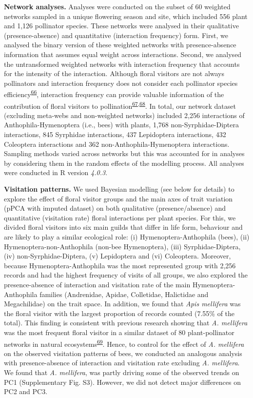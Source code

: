 \documentclass[12pt,a4paper,]{article}
\begin{document}
\textbf{Network analyses.} Analyses were conducted on the subset of 60
weighted networks sampled in a unique flowering season and site, which
included 556 plant and 1,126 pollinator species. These networks were
analysed in their qualitative (presence-absence) and quantitative
(interaction frequency) form. First, we analysed the binary version of
these weighted networks with presence-absence information that assumes
equal weight across interactions. Second, we analysed the untransformed
weighted networks with interaction frequency that accounts for the
intensity of the interaction. Although floral visitors are not always
pollinators and interaction frequency does not consider each pollinator
species
efficiency\textsuperscript{\protect\hyperlink{ref-ballantyne2015}{66}},
interaction frequency can provide valuable information of the
contribution of floral visitors to
pollination\textsuperscript{\protect\hyperlink{ref-vazquez2005}{67},\protect\hyperlink{ref-vazquez2012}{68}}.
In total, our network dataset (excluding meta-webs and non-weighted
networks) included 2,256 interactions of Anthophila-Hymenoptera (i.e.,
bees) with plants, 1,768 non-Syrphidae-Diptera interactions, 845
Syrphidae interactions, 437 Lepidoptera interactions, 432 Coleoptera
interactions and 362 non-Anthophila-Hymenoptera interactions. Sampling
methods varied across networks but this was accounted for in analyses by
considering them in the random effects of the modelling process. All
analyses were conducted in R version \emph{4.0.3}.

\textbf{Visitation patterns.} We used Bayesian modelling (see below for
details) to explore the effect of floral visitor groups and the main
axes of trait variation (pPCA with imputed dataset) on both qualitative
(presence/absence) and quantitative (visitation rate) floral
interactions per plant species. For this, we divided floral visitors
into six main guilds that differ in life form, behaviour and are likely
to play a similar ecological role: (i) Hymenoptera-Anthophila (bees),
(ii) Hymenoptera-non-Anthophila (non-bee Hymenoptera), (iii)
Syrphidae-Diptera, (iv) non-Syrphidae-Diptera, (v) Lepidoptera and (vi)
Coleoptera. Moreover, because Hymenoptera-Anthophila was the most
represented group with 2,256 records and had the highest frequency of
visits of all groups, we also explored the presence-absence of
interaction and visitation rate of the main Hymenoptera-Anthophila
families (Andrenidae, Apidae, Colletidae, Halictidae and Megachilidae)
on the trait space. In addition, we found that \emph{Apis mellifera} was
the floral visitor with the largest proportion of records counted
(7.55\% of the total). This finding is consistent with previous research
showing that \emph{A. mellifera} was the most frequent floral visitor in
a similar dataset of 80 plant-pollinator networks in natural
ecosystems\textsuperscript{\protect\hyperlink{ref-hung2018}{69}}. Hence,
to control for the effect of \emph{A. mellifera} on the observed
visitation patterns of bees, we conducted an analogous analysis with
presence-absence of interaction and visitation rate excluding \emph{A.
mellifera}. We found that \emph{A. mellifera}, was partly driving some
of the observed trends on PC1 (Supplementary Fig. S3). However, we did
not detect major differences on PC2 and PC3.
\end{document}
